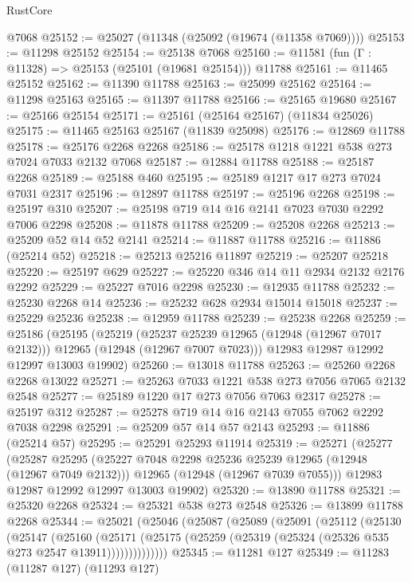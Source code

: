 \begin{lexlean}{RustCore}
\begin{coremodule}
    @7068
@25152 := @25027 (@11348 (@25092 (@19674 (@11358 @7069))))
@25153 := @11298 @25152
@25154 := @25138 @7068
@25160 := @11581 (fun (Γ : @11328) => @25153 (@25101 (@19681 @25154))) @11788
@25161 := @11465 @25152
@25162 := @11390 @11788
@25163 := @25099 @25162
@25164 := @11298 @25163
@25165 := @11397 @11788
@25166 := @25165 @19680
@25167 := @25166 @25154
@25171 := @25161 (@25164 @25167) (@11834 @25026)
@25175 := @11465 @25163 @25167 (@11839 @25098)
@25176 := @12869 @11788
@25178 := @25176 @2268 @2268
@25186 := @25178 @1218 @1221 @538 @273 @7024 @7033 @2132 @7068
@25187 := @12884 @11788
@25188 := @25187 @2268
@25189 := @25188 @460
@25195 := @25189 @1217 @17 @273 @7024 @7031 @2317
@25196 := @12897 @11788
@25197 := @25196 @2268
@25198 := @25197 @310
@25207 := @25198 @719 @14 @16 @2141 @7023 @7030 @2292 @7006 @2298
@25208 := @11878 @11788
@25209 := @25208 @2268
@25213 := @25209 @52 @14 @52 @2141
@25214 := @11887 @11788
@25216 := @11886 (@25214 @52)
@25218 := @25213 @25216 @11897
@25219 := @25207 @25218
@25220 := @25197 @629
@25227 := @25220 @346 @14 @11 @2934 @2132 @2176 @2292
@25229 := @25227 @7016 @2298
@25230 := @12935 @11788
@25232 := @25230 @2268 @14
@25236 := @25232 @628 @2934 @15014 @15018
@25237 := @25229 @25236
@25238 := @12959 @11788
@25239 := @25238 @2268
@25259 := @25186
    (@25195
      (@25219
        (@25237 @25239 @12965 (@12948 (@12967 @7017 @2132)))
        @12965
        (@12948 (@12967 @7007 @7023)))
      @12983
      @12987
      @12992
      @12997
      @13003
      @19902)
@25260 := @13018 @11788
@25263 := @25260 @2268 @2268 @13022
@25271 := @25263 @7033 @1221 @538 @273 @7056 @7065 @2132 @2548
@25277 := @25189 @1220 @17 @273 @7056 @7063 @2317
@25278 := @25197 @312
@25287 := @25278 @719 @14 @16 @2143 @7055 @7062 @2292 @7038 @2298
@25291 := @25209 @57 @14 @57 @2143
@25293 := @11886 (@25214 @57)
@25295 := @25291 @25293 @11914
@25319 := @25271
    (@25277
      (@25287
        @25295
        (@25227 @7048 @2298 @25236 @25239 @12965 (@12948 (@12967 @7049 @2132)))
        @12965
        (@12948 (@12967 @7039 @7055)))
      @12983
      @12987
      @12992
      @12997
      @13003
      @19902)
@25320 := @13890 @11788
@25321 := @25320 @2268
@25324 := @25321 @538 @273 @2548
@25326 := @13899 @11788 @2268
@25344 := @25021
    (@25046
      (@25087
        (@25089
          (@25091
            (@25112
              (@25130
                (@25147
                  (@25160
                    (@25171
                      (@25175 (@25259 (@25319 (@25324 (@25326 @535 @273 @2547 @13911))))))))))))))
@25345 := @11281 @127
@25349 := @11283 (@11287 @127) (@11293 @127)

\end{coremodule}
\end{lexlean}
